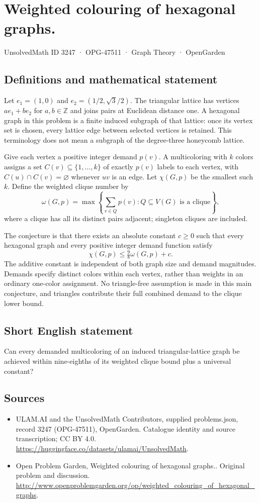 \documentclass[11pt,a4paper]{article}
\begin{document}
\section*{Weighted colouring of hexagonal graphs.}\label{3247}
{\small UnsolvedMath ID 3247 · OPG-47511 · Graph Theory · OpenGarden}
\subsection{Definitions and mathematical statement}
Let $e_1=(1,0)$ and $e_2=(1/2,\sqrt3/2)$. The triangular lattice has vertices $ae_1+be_2$ for $a,b\in\mathbb Z$ and joins pairs at Euclidean distance one. A hexagonal graph in this problem is a finite induced subgraph of that lattice: once its vertex set is chosen, every lattice edge between selected vertices is retained. This terminology does not mean a subgraph of the degree-three honeycomb lattice.

Give each vertex a positive integer demand $p(v)$. A multicoloring with $k$ colors assigns a set $C(v)\subseteq\{1,\ldots,k\}$ of exactly $p(v)$ labels to each vertex, with $C(u)\cap C(v)=\varnothing$ whenever $uv$ is an edge. Let $\chi(G,p)$ be the smallest such $k$. Define the weighted clique number by
\[
 \omega(G,p)=\max\left\{\sum_{v\in Q}p(v):Q\subseteq V(G)
                          \text{ is a clique}\right\},
\]
where a clique has all its distinct pairs adjacent; singleton cliques are included.

The conjecture is that there exists an absolute constant $c\ge0$ such that every hexagonal graph and every positive integer demand function satisfy
\[
                         \chi(G,p)\le\tfrac98\omega(G,p)+c.
\]
The additive constant is independent of both graph size and demand magnitudes. Demands specify distinct colors within each vertex, rather than weights in an ordinary one-color assignment. No triangle-free assumption is made in this main conjecture, and triangles contribute their full combined demand to the clique lower bound.
\subsection{Short English statement}
Can every demanded multicoloring of an induced triangular-lattice graph be achieved within nine-eighths of its weighted clique bound plus a universal constant?
\subsection{Sources}
\begin{itemize}
\item[S1] ULAM.AI and the UnsolvedMath Contributors, supplied problems.json, record 3247 (OPG-47511), OpenGarden. Catalogue identity and source transcription; CC BY 4.0.
\url{https://huggingface.co/datasets/ulamai/UnsolvedMath}.
\item[S2] Open Problem Garden, Weighted colouring of hexagonal graphs.. Original problem and discussion.
\url{http://www.openproblemgarden.org/op/weighted_colouring_of_hexagonal_graphs}.
\end{itemize}
\end{document}
